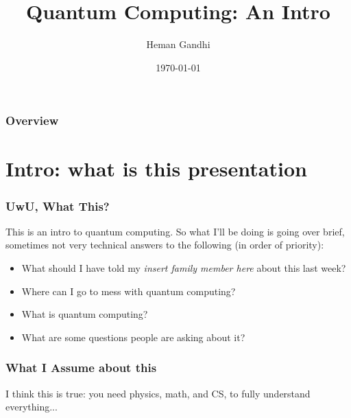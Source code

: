 \documentclass{beamer}
\title[Intro to Quantum]{Quantum Computing: An Intro} %
\author{Heman Gandhi} %
\institute[Rutgers] %
{
 Rutgers -- HackRU RnD\\ %
\medskip
\textit{hemang@ndhi.ninja} %
}
\date{\today} %
\begin{document}
\begin{frame}
\titlepage %
\end{frame}

\begin{frame}
\frametitle{Overview} %
\tableofcontents %
\end{frame}


\section{Intro: what is this presentation} %

\begin{frame}
\frametitle{UwU, What This?}
This is an intro to quantum computing.
So what I'll be doing is going over brief,
sometimes not very technical answers to the following (in order of priority):
\begin{itemize}
    \item What should I have told my \textit{insert family member here} about this last week?
    \item Where can I go to mess with quantum computing?
    \item What is quantum computing?
    \item What are some questions people are asking about it?
\end{itemize}
\end{frame}

\begin{frame}
\frametitle{What I Assume about this}
I think this is true: you need physics, math, and CS, to fully understand everything...
\end{frame}
\end{document}
